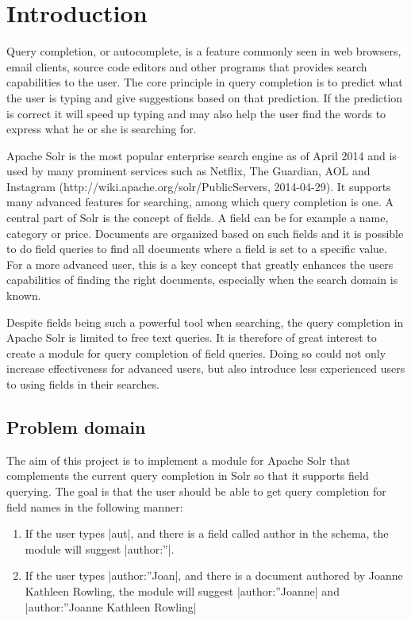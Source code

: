 \section{Introduction}\label{introduction}
Query completion, or autocomplete, is a feature commonly seen in web browsers, email clients, source code editors and other programs that provides search capabilities to the user. The core principle in query completion is to predict what the user is typing and give suggestions based on that prediction. If the prediction is correct it will speed up typing and may also help the user find the words to express what he or she is searching for. 

Apache Solr is the most popular enterprise search engine as of April 2014\cite{ranking} and is used by many prominent services such as Netflix, The Guardian, AOL and Instagram (http://wiki.apache.org/solr/PublicServers, 2014-04-29). It supports many advanced features for searching, among which query completion is one. A central part of Solr is the concept of fields. A field can be for example a name, category or price. Documents are organized based on such fields and it is possible to do field queries to find all documents where a field is set to a specific value. For a more advanced user, this is a key concept that greatly enhances the users capabilities of finding the right documents, especially when the search domain is known. 

Despite fields being such a powerful tool when searching, the query completion in Apache Solr is limited to free text queries. It is therefore of great interest to create a module for query completion of field queries. Doing so could not only increase effectiveness for advanced users, but also introduce less experienced users to using fields in their searches.


\subsection{Problem domain}

The aim of this project is to implement a module for Apache Solr that complements the current query completion in Solr so that it supports field querying. The goal is that the user should be able to get query completion for field names in the following manner:
\begin{enumerate}
\item   If the user types |aut|, and there is a field called author in the schema, the module will suggest |author:”|. 
\item   If the user types |author:”Joan|, and there is a document authored by Joanne Kathleen Rowling, the module will suggest |author:”Joanne| and |author:”Joanne Kathleen Rowling|
\end{enumerate}

